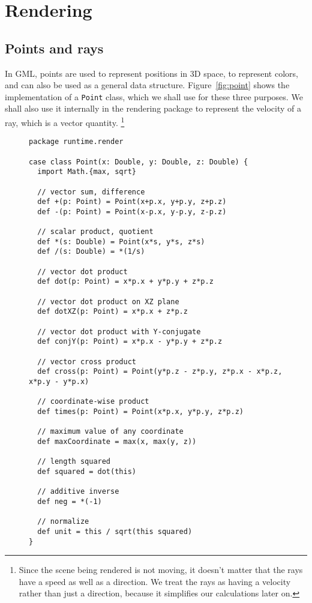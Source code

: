 \section{Rendering\label{sec:rendering}}

\subsection{Points and rays\label{sec:point}}

In GML, points are used to represent positions in 3D space,
to represent colors,
and can also be used as a general data structure.
Figure~\ref{fig:point} shows the implementation of a \verb!Point! class,
which we shall use for these three purposes.
We shall also use it internally in the rendering package
to represent the velocity of a ray,
which is a vector quantity.%
\footnote{Since the scene being rendered is not moving,
it doesn't matter that the rays have a speed as well as a direction.
We treat the rays as having a velocity rather than just a direction,
because it simplifies our calculations later on.}

\begin{figure}
\begin{verbatim}
package runtime.render

case class Point(x: Double, y: Double, z: Double) {
  import Math.{max, sqrt}

  // vector sum, difference
  def +(p: Point) = Point(x+p.x, y+p.y, z+p.z)
  def -(p: Point) = Point(x-p.x, y-p.y, z-p.z)

  // scalar product, quotient
  def *(s: Double) = Point(x*s, y*s, z*s)
  def /(s: Double) = *(1/s)

  // vector dot product
  def dot(p: Point) = x*p.x + y*p.y + z*p.z

  // vector dot product on XZ plane
  def dotXZ(p: Point) = x*p.x + z*p.z

  // vector dot product with Y-conjugate
  def conjY(p: Point) = x*p.x - y*p.y + z*p.z

  // vector cross product
  def cross(p: Point) = Point(y*p.z - z*p.y, z*p.x - x*p.z, x*p.y - y*p.x)

  // coordinate-wise product
  def times(p: Point) = Point(x*p.x, y*p.y, z*p.z)

  // maximum value of any coordinate
  def maxCoordinate = max(x, max(y, z))

  // length squared
  def squared = dot(this)

  // additive inverse
  def neg = *(-1)

  // normalize
  def unit = this / sqrt(this squared)
}
\end{verbatim}
\getcaption
\end{figure}

